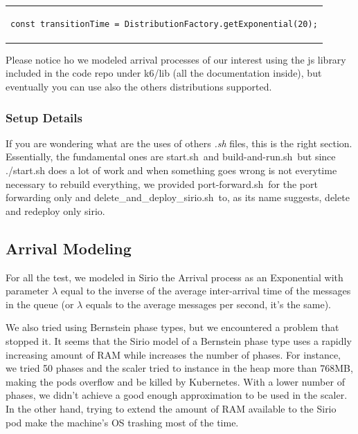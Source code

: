 \begin{table}[!htb]
\centering
\begin{tabular}{c}
\begin{lstlisting}
const transitionTime = DistributionFactory.getExponential(20);
\end{lstlisting}
\end{tabular}
\end{table}


Please notice ho we modeled arrival processes of our interest using the js library included in the code repo under k6/lib (all the documentation inside), but eventually you can use also the others distributions supported.

\subsubsection{Setup Details}

If you are wondering what are the uses of others \textit{.sh} files, this is the right section. Essentially, the fundamental ones are \guillemotleft start.sh\guillemotright \ and \guillemotleft build-and-run.sh\guillemotright \ but since ./start.sh does a lot of work and when something goes wrong is not everytime necessary to rebuild everything, we provided \guillemotleft port-forward.sh\guillemotright \ for the port forwarding only and \guillemotleft delete\_and\_deploy\_sirio.sh\guillemotright \ to, as its name suggests, delete and redeploy only sirio.

\subsection{Arrival Modeling}
For all the test, we modeled in Sirio the Arrival process as an Exponential with parameter $\lambda$ equal to the inverse of the average inter-arrival time of the messages in the queue (or $\lambda$ equals to the average messages per second, it's the same). 

We also tried using Bernstein phase types, but we encountered a problem that stopped it. It seems that the Sirio model of a Bernstein phase type uses a rapidly increasing amount of RAM while increases the number of phases. For instance, we tried 50 phases and the scaler tried to instance in the heap more than 768MB, making the pods overflow and be killed by Kubernetes. With a lower number of phases, we didn't achieve a good enough approximation to be used in the scaler. In the other hand, trying to extend the amount of RAM available to the Sirio pod make the machine's OS trashing most of the time.

